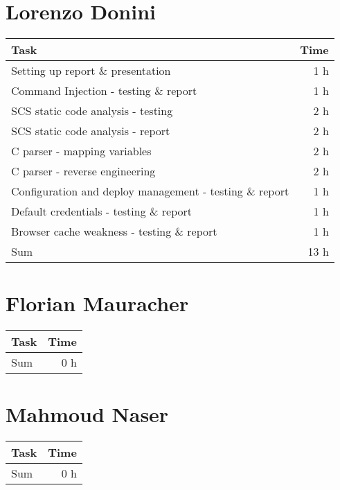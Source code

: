 \clearpage
\section*{Lorenzo Donini}
\begin{table}[h!tpb]
  \centering
  \begin{tabularx}{\textwidth}{X r}
    \toprule
      Task & Time \\
    \midrule
      Setting up report \& presentation & 1 h \\
      Command Injection - testing \& report & 1 h \\
      SCS static code analysis - testing & 2 h \\
      SCS static code analysis - report & 2 h \\
      C parser - mapping variables & 2 h \\
      C parser - reverse engineering & 2 h \\
      Configuration and deploy management - testing \& report & 1 h \\
      Default credentials - testing \& report & 1 h \\
      Browser cache weakness - testing \& report & 1 h \\
    \midrule
      Sum & 13 h \\
    \bottomrule
  \end{tabularx}
\end{table}

\clearpage
\section*{Florian Mauracher}
\begin{table}[h!tpb]
  \centering
  \begin{tabularx}{\textwidth}{X r}
    \toprule
      Task & Time \\
    \midrule
    \midrule
      Sum & 0 h \\
    \bottomrule
  \end{tabularx}
\end{table}

\clearpage
\section*{Mahmoud Naser}
\begin{table}[h!tpb]
  \centering
  \begin{tabularx}{\textwidth}{X r}
    \toprule
      Task & Time \\
    \midrule
    \midrule
      Sum & 0 h \\
    \bottomrule
  \end{tabularx}
\end{table}
